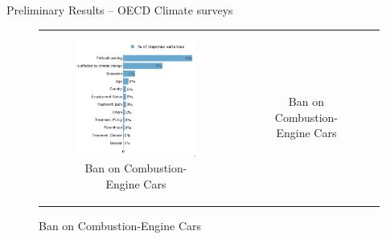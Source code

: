\documentclass{article}
\begin{document}
\begin{LARGE}
	\begin{center}
		Preliminary Results – OECD Climate surveys	
	\end{center}
	
\end{LARGE}
	\tableofcontents
	\listoffigures

\clearpage


\begin{figure}[h!]
\begin{center}
	\caption{Variance decomposition LMG}
	\setlength\extrarowheight{-1pt}
	\begin{tabular}{cc}
		\begin{subfigure}{0.5\textwidth}
		\caption{Ban on Combustion-Engine Cars}
			\includegraphics[width=\textwidth]{lmg_standard_socio_non_standardized}
		\end{subfigure}&
		\begin{subfigure}{0.5\textwidth}
		\caption{Ban on Combustion-Engine Cars}

\end{subfigure}
\end{tabular}
\end{center}
\end{figure}
\end{document}
